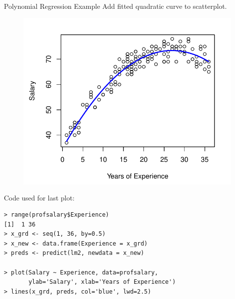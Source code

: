\documentclass[10pt]{beamer}
\begin{document}
\begin{frame}{Polynomial Regression Example}
Add fitted quadratic curve to scatterplot.
\begin{figure}
\includegraphics[scale=0.6]{figure/salary_polypred.pdf}
\end{figure}
\end{frame}

\begin{frame}[fragile]
Code used for last plot:
\begin{verbatim}
> range(profsalary$Experience)
[1]  1 36
> x_grd <- seq(1, 36, by=0.5)
> x_new <- data.frame(Experience = x_grd)
> preds <- predict(lm2, newdata = x_new)

> plot(Salary ~ Experience, data=profsalary, 
       ylab='Salary', xlab='Years of Experience')
> lines(x_grd, preds, col='blue', lwd=2.5)
\end{verbatim}
\end{frame}
\end{document}
